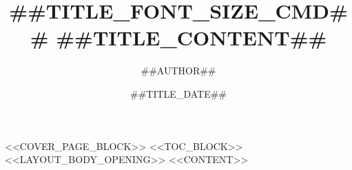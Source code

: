 \documentclass[##DOCCLASS_BASE_FONT_SIZE##,##DOCCLASS_ORIENTATION##,<<DOC_CLASS_COLUMNS>><<DOC_CLASS_FONTSET>>]{ctexart} %
\title{##TITLE_FONT_SIZE_CMD## ##TITLE_CONTENT##}			%
\author{##AUTHOR##}			%
\date{##TITLE_DATE##}
\begin{document}
	<<COVER_PAGE_BLOCK>>	%
	<<TOC_BLOCK>>			%
	<<LAYOUT_BODY_OPENING>>	%
	<<CONTENT>>			%
\end{document}
